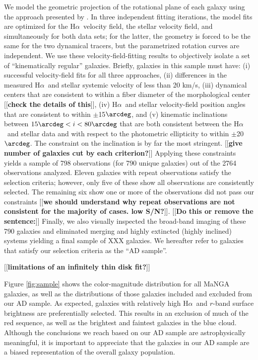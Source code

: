\documentclass[apj,iop,revtex4,numberedappendix]{emulateapj}
\newcommand{\comment}[2][todo]{{\color{#1}[[{\bf #2}]]}}
\newcommand{\halpha}{H$\alpha$}
\begin{document}
We model the geometric projection of the rotational plane of each galaxy
using the approach presented by \citep[][see also
\citealt{2011ApJ...742...18W}]{2003ApJ...599L..79A}.  In three
independent fitting iterations, the model fits are optimized for the
\halpha\ velocity field, the stellar velocity field, and simultaneously
for both data sets; for the latter, the geometry is forced to be the
same for the two dynamical tracers, but the parametrized rotation curves
are independent.  We use these velocity-field-fitting results to
objectively isolate a set of ``kinematically regular'' galaxies.
Briefly, galaxies in this sample must have: (i) successful
velocity-field fits for all three approaches, (ii) differences in the
measured \halpha\ and stellar systemic velocity of less than 20 km/s,
(iii) dynamical centers that are consistent to within a fiber diameter
of the morphological center \comment{check the details of this}, (iv)
\halpha\ and stellar velocity-field position angles that are consistent
to within $\pm$15$\arcdeg$, and (v) kinematic inclinations between
$15\arcdeg < i < 80\arcdeg$ that are both consistent between the
\halpha\ and stellar data and with respect to the photometric
ellipticity to within $\pm$20$\arcdeg$.  The constraint on the
inclination is by far the most stringent. \comment{give number of
galaxies cut by each criterion?}  Applying these constraints yields a
sample of 798 observations (for 790 unique galaxies) out of the 2764
observations analyzed.  Eleven galaxies with repeat observations satisfy
the selection criteria; however, only five of these show all
observations are consistently selected.  The remaining six show one or
more of the observations did not pass our constraints \comment{we should
understand why repeat observations are not consistent for the majority
of cases.  low S/N?}.  \comment{Do this or remove the sentence:}
Finally, we also visually inspected the broad-band imaging of these 790
galaxies and eliminated merging and highly extincted (highly inclined)
systems yielding a final sample of XXX galaxies.  We hereafter refer to
galaxies that satisfy our selection criteria as the ``AD sample''.

\comment{limitations of an infinitely thin disk fit?}

Figure \ref{fig:sample} shows the color-magnitude distribution for all
MaNGA galaxies, as well as the distributions of those galaxies included
and excluded from our AD sample.  As expected, galaxies with relatively
high \halpha\ and $r$-band surface brightness are preferentially
selected.  This results in an exclusion of much of the red sequence, as
well as the brightest and faintest galaxies in the blue cloud.  Although
the conclusions we reach based on our AD sample are astrophysically
meaningful, it is important to appreciate that the galaxies in our AD
sample are a biased representation of the overall galaxy population.
\end{document}
